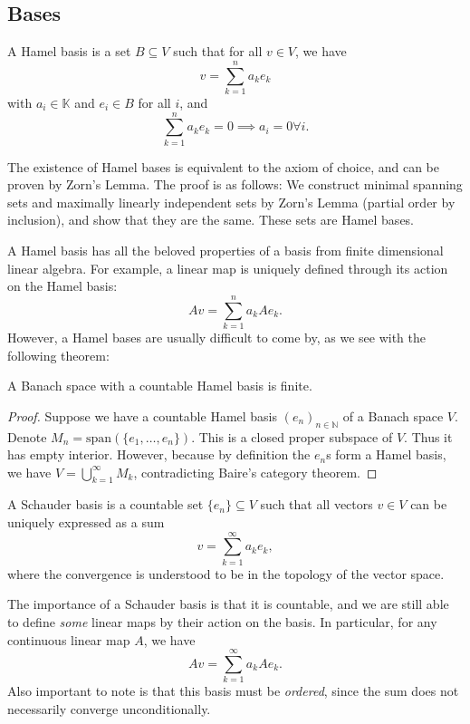 \documentclass[prb,12pt]{revtex4-2}
\theoremstyle{definition}
\theoremstyle{definition}
\theoremstyle{definition}
\newcommand{\N}{\mathbb{N}}
\begin{document}
	\subsection{Bases}
	\begin{Definition}
		A Hamel basis is a set $B\subseteq V$ such that for all $v\in V$, we have
		\[v=\sum_{k=1}^n a_k e_k\]
		with $a_i\in \mathbb{K}$ and $e_i\in B$ for all $i$, and
		\[\sum_{k=1}^n a_k e_k=0\implies a_i=0\forall i.\]
	\end{Definition}
	The existence of Hamel bases is equivalent to the axiom of choice, and can be proven by Zorn's Lemma. The proof is as follows: We construct minimal spanning sets and maximally linearly independent sets by Zorn's Lemma (partial order by inclusion), and show that they are the same. These sets are Hamel bases.
	
	A Hamel basis has all the beloved properties of a basis from finite dimensional linear algebra. For example, a linear map is uniquely defined through its action on the Hamel basis:
	\[Av = \sum_{k=1}^n a_k Ae_k.\]
	However, a Hamel bases are usually difficult to come by, as we see with the following theorem:
	\begin{Theorem}
		A Banach space with a countable Hamel basis is finite. 
	\end{Theorem}
\begin{proof}
	Suppose we have a countable Hamel basis $(e_n)_{n\in \N}$ of a Banach space $V$. Denote $M_n=\text{span}(\{e_1, \dots, e_n\})$. This is a closed proper subspace of $V$. Thus it has empty interior. However, because by definition the $e_n$s form a Hamel basis, we have $V=\bigcup_{k=1}^\infty M_k$, contradicting Baire's category theorem.
\end{proof}
	\begin{Definition}
		A Schauder basis is a countable set $\{e_n\}\subseteq V$ such that all vectors $v\in V$ can be uniquely expressed as a sum
		\[v=\sum_{k=1}^\infty a_k e_k,\]
		where the convergence is understood to be in the topology of the vector space. 
	\end{Definition}
The importance of a Schauder basis is that it is countable, and we are still able to define \emph{some} linear maps by their action on the basis. In particular, for any continuous linear map $A$, we have
\[Av = \sum_{k=1}^\infty a_k Ae_k.\]
Also important to note is that this basis must be \emph{ordered}, since the sum does not necessarily converge unconditionally. 
\end{document}

